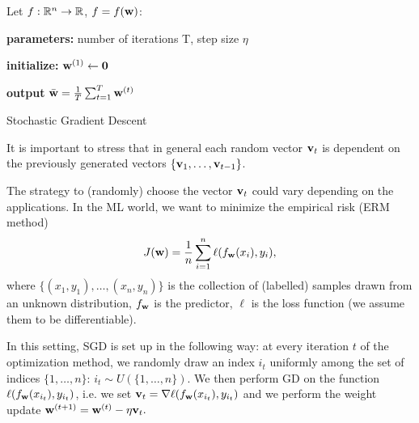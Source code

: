 \documentclass{article}
\begin{document}
Let $f: \mathbb{R}^n \to \mathbb{R}$, $f =f({\bf w})$:
%
%  
%  
% 
\begin{algorithm}[H]
\SetAlgoLined
\textbf{parameters:} number of iterations T, step size $\eta$ %

\textbf{initialize:} ${\bf w}^{(1)} \gets {\bf 0}$

 
 \textbf{output} $\bar{\bf w} = \frac{1}{T} \sum_{t=1}^T {\bf w}^{(t)}$
 \caption{Stochastic Gradient Descent \label{SGDalgo}}
\end{algorithm}


\begin{note}
It is important to stress that in general each random vector ${\bf v}_t$ is dependent on the previously generated vectors $\{{\bf v}_1, \ldots, {\bf v}_{t-1} \}$.
\end{note}

The strategy to (randomly) choose the vector ${\bf v}_t$ could vary depending on the applications. In the ML world, we want to minimize the empirical risk (ERM method)
$$J({\bf w}) = \dfrac{1}{n} \sum_{i=1}^n \ell(f_{{\bf w}}(x_i),y_i),$$
where $\{(x_1,y_1), \ldots, (x_n,y_n)\}$ is the collection of (labelled) samples drawn from an unknown distribution, $f_{\bf w}$ is the predictor, $\ell$ is the loss function (we assume them to be differentiable).

\vspace{2ex}

In this setting, SGD is set up in the following way: at every iteration $t$ of the optimization method, we randomly draw an index $i_t$ uniformly among the set of indices $\{1, \ldots, n\}$: $i_t \sim U(\{1, \ldots, n\})$. We then perform GD on the function $\ell(f_{\bf w}(x_{i_t}),y_{i_t})$, i.e. we set ${\bf v}_t = \nabla \ell (f_{\bf w}(x_{i_t}),y_{i_t}) $
and we perform the weight update ${\bf w}^{(t+1)} = {\bf w}^{(t)} -\eta {\bf v}_t.$
\\
\end{document}
